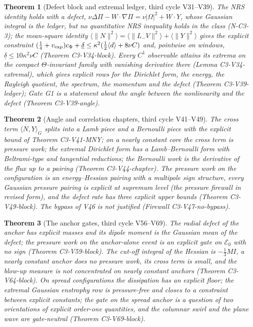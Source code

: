 \documentclass[11pt]{article}
\theoremstyle{plain}
\newtheorem{theorem}{Theorem}[section]
\theoremstyle{definition}
\theoremstyle{remark}
\begin{document}
\begin{theorem}[Defect block and extremal ledger, third cycle V31--V39]
\label{thm:c4v1-defect}
The NRS identity holds with a defect, \(\nu\Delta\Pi-W\cdot\nabla\Pi=\nu|\Omega|^2+W\cdot Y\), whose
Gaussian integral is the ledger, but no quantitative NRS inequality
holds in the class (N-C3-3); the mean-square identity
\(\langle\|N\|^2\rangle=\langle\|L_-V\|^2\rangle+\langle\|Y\|^2\rangle\) gives the explicit constraint
\((\frac14+v_{\rm exp})c_\Phi+\underline\delta\le\kappa^2(\frac12\langle d\rangle+8\nu C)\) and, pointwise on windows,
\(\underline\delta\le10\kappa^2\nu C\) (Theorem C3-V34-block).  Every \(C^1\) observable
attains its extrema on the compact \(\Theta\)-invariant family with
vanishing derivative there (Lemma C3-V34-extremal), which gives
explicit rows for the Dirichlet form, the energy, the Rayleigh
quotient, the spectrum, the momentum and the defect
(Theorem C3-V39-ledger); Gate G1 is a statement about the angle
between the nonlinearity and the defect (Theorem C3-V39-angle).
\end{theorem}

\begin{theorem}[Angle and correlation chapters, third cycle V41--V49]
\label{thm:c4v1-angle}
The cross term \(\langle N,Y\rangle_G\) splits into a Lamb piece and a Bernoulli
piece with the explicit bound of Theorem C3-V41-MNY; on a nearly
constant core the cross term is pressure work; the extremal
Dirichlet form has a Lamb--Bernoulli form with Beltrami-type and
tangential reductions; the Bernoulli work is the derivative of the
flux up to a pairing (Theorem C3-V44-chapter).  The pressure work
on the configuration is an energy--Hessian pairing with a multipole
sign structure, every Gaussian pressure pairing is explicit at
supremum level (the pressure firewall in revised form), and the
defect rate has three explicit upper bounds
(Theorem C3-V49-block).  The bypass of V46 is not justified
(Firewall C3-V47-no-bypass).
\end{theorem}

\begin{theorem}[The anchor gates, third cycle V56--V69]
\label{thm:c4v1-anchor}
The radial defect of the anchor has explicit masses and its dipole
moment is the Gaussian mean of the defect; the pressure work on the
anchor-alone event is an explicit gate on \(\mathcal E_0\) with no sign
(Theorem C3-V59-block).  The cut-off integral of the Hessian is
\(-\frac13MI\), a nearly constant anchor does no pressure work, its cross
term is small, and the blow-up measure is not concentrated on nearly
constant anchors (Theorem C3-V64-block).  On spread
configurations the dissipation has an explicit floor; the extremal
Gaussian enstrophy row is pressure-free and closes to a constraint
between explicit constants; the gate on the spread anchor is a
question of two orientations of explicit order-one quantities, and
the columnar swirl and the plane wave are gate-neutral
(Theorem C3-V69-block).
\end{theorem}
\end{document}
